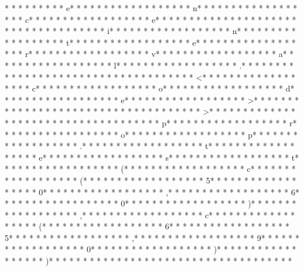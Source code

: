  *  * * *  *  * * *  * e* * *  * * *  * * *  *  * * *  *  * * *  * n* * *  * * *  * * *  *  * * *  *  * * *  * c* * *  * * *  * * *  *  * * *  *  * * *  * e* * *  * * *  * * *  *  * * *  *  * * *  *  * * *  * * *  * * *  *  * * *  *  * * *  * i* * *  * * *  * * *  *  * * *  *  * * *  * n* * *  * * *  * * *  *  * * *  *  * * *  * t* * *  * * *  * * *  *  * * *  *  * * *  * e* * *  * * *  * * *  *  * * *  *  * * *  * r* * *  * * *  * * *  *  * * *  *  * * *  * v* * *  * * *  * * *  *  * * *  *  * * *  * a* * *  * * *  * * *  *  * * *  *  * * *  * l* * *  * * *  * * *  *  * * *  *  * * *  * .* * *  * * *  * * *  *  * * *  *  * * *  * 
* * *  * * *  * * *  *  * * *  *  * * *  * <* * *  * * *  * * *  *  * * *  *  * * *  * c* * *  * * *  * * *  *  * * *  *  * * *  * o* * *  * * *  * * *  *  * * *  *  * * *  * d* * *  * * *  * * *  *  * * *  *  * * *  * e* * *  * * *  * * *  *  * * *  *  * * *  * >* * *  * * *  * * *  *  * * *  *  * * *  * 
* * *  * * *  * * *  *  * * *  *  * * *  * >* * *  * * *  * * *  *  * * *  *  * * *  *  * * *  * * *  * * *  *  * * *  *  * * *  * p* * *  * * *  * * *  *  * * *  *  * * *  * r* * *  * * *  * * *  *  * * *  *  * * *  * o* * *  * * *  * * *  *  * * *  *  * * *  * p* * *  * * *  * * *  *  * * *  *  * * *  * .* * *  * * *  * * *  *  * * *  *  * * *  * t* * *  * * *  * * *  *  * * *  *  * * *  * e* * *  * * *  * * *  *  * * *  *  * * *  * s* * *  * * *  * * *  *  * * *  *  * * *  * t* * *  * * *  * * *  *  * * *  *  * * *  * (* * *  * * *  * * *  *  * * *  *  * * *  * c* * *  * * *  * * *  *  * * *  *  * * *  * (* * *  * * *  * * *  *  * * *  *  * * *  * 5* * *  * * *  * * *  *  * * *  *  * * *  * 0* * *  * * *  * * *  *  * * *  *  * * *  * ,* * *  * * *  * * *  *  * * *  *  * * *  * 6* * *  * * *  * * *  *  * * *  *  * * *  * 0* * *  * * *  * * *  *  * * *  *  * * *  * )* * *  * * *  * * *  *  * * *  *  * * *  * ,* * *  * * *  * * *  *  * * *  *  * * *  * c* * *  * * *  * * *  *  * * *  *  * * *  * (* * *  * * *  * * *  *  * * *  *  * * *  * 6* * *  * * *  * * *  *  * * *  *  * * *  * 5* * *  * * *  * * *  *  * * *  *  * * *  * ,* * *  * * *  * * *  *  * * *  *  * * *  * 9* * *  * * *  * * *  *  * * *  *  * * *  * 0* * *  * * *  * * *  *  * * *  *  * * *  * )* * *  * * *  * * *  *  * * *  *  * * *  * )* * *  * * *  * * *  *  * * *  *  * * *  * 
* * *  * * *  * * *  *  * * *  *  * * *  * 

